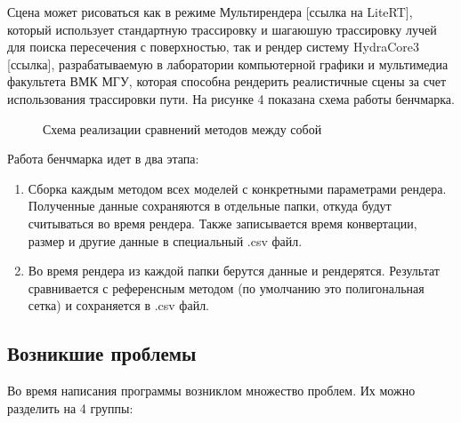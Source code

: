 \documentclass[a4paper,hidelinks,12pt]{article}
\begin{document}
Сцена может рисоваться 
как в режиме Мультирендера [ссылка на LiteRT], который использует стандартную трассировку и шагаюшую трассировку лучей для поиска пересечения с поверхностью, так и рендер систему 
HydraCore3 [ссылка], разрабатываемую в лаборатории компьютерной графики и мультимедиа факультета ВМК МГУ, которая способна рендерить реалистичные сцены
за счет использования трассировки пути. На рисунке 4 показана схема работы бенчмарка.

\begin{figure}[h]
  \centering
  \caption{Схема реализации сравнений методов между собой}
  \label{fig:my_label}
\end{figure}

\newpage

Работа бенчмарка идет в два этапа:
\begin{enumerate}
	\item Сборка каждым методом всех моделей с конкретными параметрами рендера. Полученные данные сохраняются в отдельные папки, откуда будут считываться во время рендера. Также записывается 
	время конвертации, размер и другие данные в специальный .csv файл.
	\item Во время рендера из каждой папки берутся данные и рендерятся. Результат сравнивается с референсным методом (по умолчанию это полигональная сетка) и сохраняется в .csv файл.
\end{enumerate}

\subsection{Возникшие проблемы}

Во время написания программы возниклом множество проблем. Их можно разделить на 4 группы:
\end{document}
